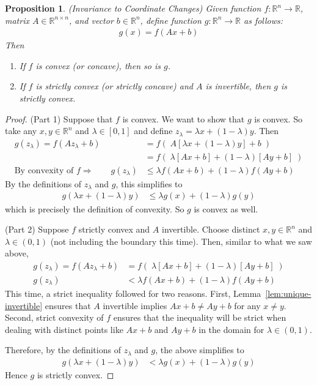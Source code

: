 \documentclass[12pt]{book}
\numberwithin{equation}{section} %
\theoremstyle{plain}
\newtheorem{prop}[thm]{Proposition}
\theoremstyle{definition}
\theoremstyle{remark}
\newcommand{\R}{\mathbb{R}}
\newcommand{\Rn}{\mathbb{R}^n}
\newcommand{\Rnn}{\mathbb{R}^{n\times n}}
\begin{document}
\begin{prop}{\emph{(Invariance to Coordinate Changes)}}
\label{prop:coordinvariance}
Given function $f:\Rn\rightarrow\R$, matrix $A\in\Rnn$, and vector
$b\in\Rn$, define function $g:\Rn\rightarrow\R$ as follows:
\begin{align*}
  g(x) = f(Ax+b)
\end{align*}
Then
\begin{enumerate}
  \item If $f$ is convex (or concave), then so is $g$.
  \item If $f$ is strictly convex (or strictly concave) and $A$ is
    invertible, then $g$ is strictly convex.
\end{enumerate}
\end{prop}
\begin{proof}
(Part 1)
Suppose that $f$ is convex. We want to show that $g$ is convex. So take
any $x,y\in\Rn$ and $\lambda\in[0,1]$ and define $z_\lambda =
\lambda x + (1-\lambda) y$. Then
\begin{align*}
  g(z_\lambda) =
  f(Az_\lambda + b)
  &= f\left( \;
    A\left[
      \lambda x + (1-\lambda) y
    \right]
    +b
  \; \right)\\
  &= f\left( \;
    \lambda \left[Ax + b\right]
    + (1-\lambda)
    \left[Ay + b\right]
  \; \right)\\
  \text{By convexity of $f$}\Rightarrow\qquad
  g(z_\lambda)
  &\leq \lambda f\left( Ax + b \right)
    + (1-\lambda)
    f\left( Ay + b \right)
\end{align*}
By the definitions of $z_\lambda$ and $g$, this simplifies to
\begin{align*}
  g(\lambda x + (1-\lambda)y)
  &\leq \lambda g(x)
    + (1-\lambda) g(y)
\end{align*}
which is precisely the definition of convexity. So $g$ is convex as
well.

(Part 2)
Suppose $f$ strictly convex and $A$ invertible. Choose distinct
$x,y\in\Rn$ and $\lambda\in(0,1)$ (not including the boundary this
time). Then, similar to what we saw above,
\begin{align*}
  g(z_\lambda) =
  f(Az_\lambda + b)
  &= f\left( \;
    \lambda \left[Ax + b\right]
    + (1-\lambda)
    \left[Ay + b\right]
  \; \right)\\
  g(z_\lambda)
  &< \lambda f\left( Ax + b \right)
    + (1-\lambda)
    f\left( Ay + b \right)
\end{align*}
This time, a strict inequality followed for two reasons. First,
Lemma~\ref{lem:unique-invertible} ensures that $A$ invertible implies
$Ax+b\neq Ay+b$ for any $x\neq y$. Second, strict convexity of $f$
ensures that the inequality will be strict when dealing with distinct
points like $Ax+b$ and $Ay+b$ in the domain for $\lambda\in(0,1)$.

Therefore, by the definitions of $z_\lambda$ and $g$, the above
simplifies to
\begin{align*}
  g(\lambda x + (1-\lambda)y)
  &< \lambda g(x)
    + (1-\lambda) g(y)
\end{align*}
Hence $g$ is strictly convex.
\end{proof}
\end{document}
